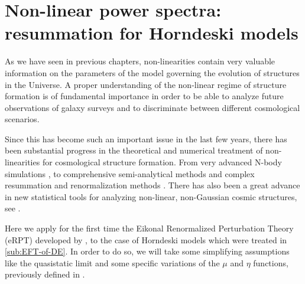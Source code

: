 \chapter{Non-linear power spectra: resummation for Horndeski models \label{chap:nonlinear}} %





As we have seen in previous chapters, non-linearities contain very valuable information
on the parameters of the model governing the evolution of structures in the Universe.
A proper understanding of the non-linear regime of structure formation is of fundamental 
importance in order to be able to analyze future observations of galaxy surveys and 
to discriminate between different cosmological scenarios.

Since this has become such an important issue in the last few years, there has been 
substantial progress in the theoretical and numerical
treatment of non-linearities for cosmological structure formation. 
From very advanced N-body simulations
, to
comprehensive semi-analytical methods  and complex resummation and renormalization methods . There has also been a great advance in
new statistical tools for analyzing non-linear, non-Gaussian cosmic structures, see
.

Here we apply for the first time the Eikonal Renormalized Perturbation Theory (eRPT) developed
by \cite{anselmi_nonlinear_2012},  to the 
case of Horndeski models which were treated in \cref{sub:EFT-of-DE}.
In order to do so, we will take some simplifying assumptions like the quasistatic limit and
some specific variations of the $\mu$ and $\eta$ functions, previously
defined in .

